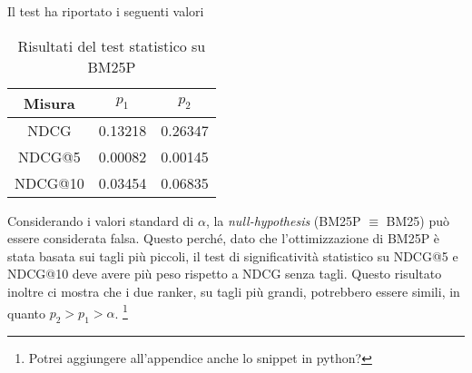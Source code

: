 Il test ha riportato i seguenti valori

\begin{table}[h!]
	\centering
	\begin{tabular}{|c|c|c|}
		\hline
		\textbf{Misura} & $p_1$ & $p_2$ \\
		\hline
		NDCG  & 0.13218 & 0.26347 \\
		\hline
		NDCG@5 & 0.00082 & 0.00145 \\
		\hline
		NDCG@10 & 0.03454 & 0.06835 \\
		\hline
	\end{tabular}
	\caption{Risultati del test statistico su BM25P}
\end{table}

Considerando i valori standard di $\alpha$, la \textit{null-hypothesis} (BM25P $\equiv$ BM25) può essere considerata falsa.
Questo perché, dato che l'ottimizzazione di BM25P è stata basata sui tagli più piccoli, il test di significatività statistico su NDCG@5 e NDCG@10 
deve avere più peso rispetto a NDCG senza tagli.
Questo risultato inoltre ci mostra che i due ranker, su tagli più grandi, potrebbero essere simili, in quanto $p_2 > p_1 > \alpha$. \footnote{Potrei aggiungere all'appendice anche lo snippet in python?}
